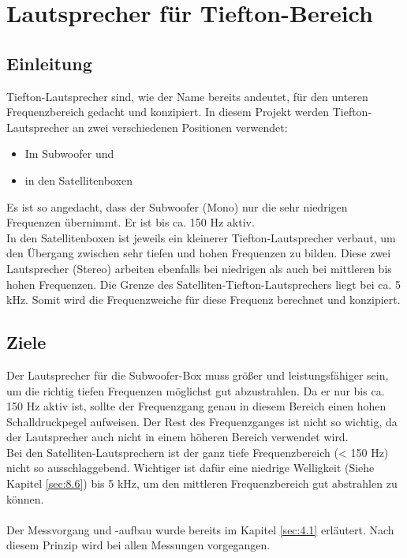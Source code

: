 
\section{Lautsprecher für Tiefton-Bereich} \label{sec:4.2}
\subsection*{Einleitung} \label{subsec:4.2.1}
Tiefton-Lautsprecher sind, wie der Name bereits andeutet, für den unteren Frequenzbereich gedacht und konzipiert.
In diesem Projekt werden Tiefton-Lautsprecher an zwei verschiedenen Positionen verwendet:
\begin{itemize}
	\item Im Subwoofer und 
	\item in den Satellitenboxen
\end{itemize}
Es ist so angedacht, dass der Subwoofer (Mono) nur die sehr niedrigen Frequenzen übernimmt.
Er ist bis ca. 150 Hz aktiv.\\
In den Satellitenboxen ist jeweils ein kleinerer Tiefton-Lautsprecher verbaut, um den Übergang zwischen sehr tiefen und hohen Frequenzen zu bilden.
Diese zwei Lautsprecher (Stereo) arbeiten ebenfalls bei niedrigen als auch bei mittleren bis hohen Frequenzen.
Die Grenze des Satelliten-Tiefton-Lautsprechers liegt bei ca. 5 kHz.
Somit wird die Frequenzweiche für diese Frequenz berechnet und konzipiert.

\subsection*{Ziele} \label{subsec:4.2.2}
Der Lautsprecher für die Subwoofer-Box muss größer und leistungsfähiger sein, um die richtig tiefen Frequenzen möglichst gut abzustrahlen.
Da er nur bis ca. 150 Hz aktiv ist, sollte der Frequenzgang genau in diesem Bereich einen hohen Schalldruckpegel aufweisen.
Der Rest des Frequenzganges ist nicht so wichtig, da der Lautsprecher auch nicht in einem höheren Bereich verwendet wird. \\
Bei den Satelliten-Lautsprechern ist der ganz tiefe Frequenzbereich (< 150 Hz) nicht so ausschlaggebend.
Wichtiger ist dafür eine niedrige Welligkeit (Siehe Kapitel \ref{sec:8.6}) bis 5 kHz, um den mittleren Frequenzbereich gut abstrahlen zu können.\\ \\
Der Messvorgang und -aufbau wurde bereits im Kapitel \ref{sec:4.1} erläutert.
Nach diesem Prinzip wird bei allen Messungen vorgegangen.

